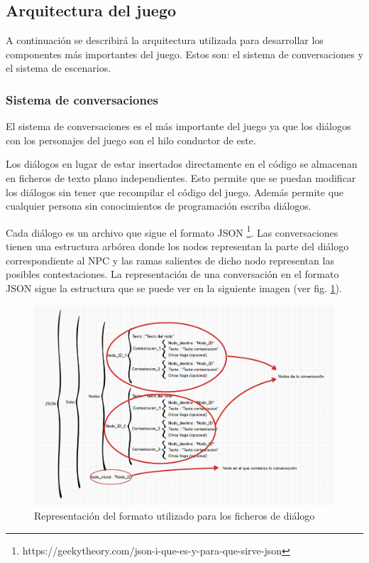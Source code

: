 \subsection{Arquitectura del juego}

A continuación se describirá la arquitectura utilizada para desarrollar los componentes más importantes del juego. Estos son: el sistema de conversaciones y el sistema de escenarios. %

\subsubsection{Sistema de conversaciones}

El sistema de conversaciones es el más importante del juego ya que los diálogos con los personajes del juego son el hilo conductor de este.

Los diálogos en lugar de estar insertados directamente en el código se almacenan en ficheros de texto plano independientes. Esto permite que se puedan modificar los diálogos sin tener que recompilar el código del juego. Además permite que cualquier persona sin conocimientos de programación escriba diálogos.

Cada diálogo es un archivo que sigue el formato JSON \footnote{https://geekytheory.com/json-i-que-es-y-para-que-sirve-json}. Las conversaciones tienen una estructura arbórea donde los nodos representan la parte del diálogo correspondiente al NPC y las ramas salientes de dicho nodo representan las posibles contestaciones. La representación de una conversación en el formato JSON sigue la estructura que se puede ver en la siguiente imagen (ver fig. \ref{jsonFormat}).

\begin{figure}[H]
\begin{center}
\includegraphics[scale=0.57]{imagenes/jsonFormat.png}
\caption{Representación del formato utilizado para los ficheros de diálogo}
\label{jsonFormat}
\end{center}
\end{figure}

